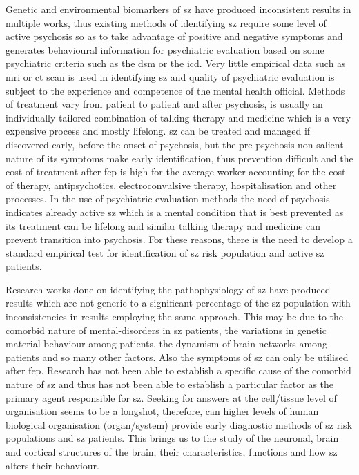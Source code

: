 Genetic and environmental biomarkers of \ac{sz} have produced inconsistent results in multiple works, thus existing methods of identifying \ac{sz} require some level of active psychosis so as to take advantage of positive and negative symptoms  and  generates behavioural information for psychiatric evaluation based on some psychiatric criteria such as the \ac{dsm} or the \ac{icd}. Very little empirical data such as \ac{mri} or \ac{ct} scan is used in identifying \ac{sz} and quality of psychiatric evaluation is subject to the experience and competence of the mental health official. Methods of treatment vary from patient to patient and after psychosis, is usually an individually tailored combination of talking therapy and medicine which is a very expensive process and mostly lifelong. \ac{sz} can be treated and managed if discovered early, before the onset of psychosis, but the pre-psychosis non salient nature of its symptoms make early identification, thus prevention difficult and the cost of treatment after \ac{fep} is high for the average worker accounting for the cost of therapy, antipsychotics, electroconvulsive therapy, hospitalisation and other processes. In the use of psychiatric evaluation methods the need of psychosis indicates already active \ac{sz} which is a mental condition that is best prevented as its treatment can be lifelong and similar talking therapy and medicine can prevent transition into psychosis. For these reasons, there is the need to develop a standard empirical test for identification of \ac{sz} risk population and active \ac{sz} patients.

Research works done on identifying the pathophysiology of \ac{sz} have produced results which are not generic to a significant percentage of the \ac{sz} population with inconsistencies in results employing the same approach. This may be due to the comorbid nature of mental-disorders in \ac{sz} patients, the variations in genetic material behaviour among patients, the dynamism of brain networks among patients and so many other factors. Also the symptoms of \ac{sz} can only be utilised after \ac{fep}. Research has not been able to establish a specific cause of the comorbid nature of \ac{sz} and thus has not been able to establish a particular factor as the primary agent responsible for \ac{sz}. Seeking for answers at the cell/tissue level of organisation seems to be a longshot, therefore, can higher levels of human biological organisation (organ/system) provide early diagnostic methods of \ac{sz} risk populations and \ac{sz} patients. This brings us to the study of the neuronal, brain and cortical structures of the brain, their characteristics, functions and how \ac{sz} alters their behaviour.

